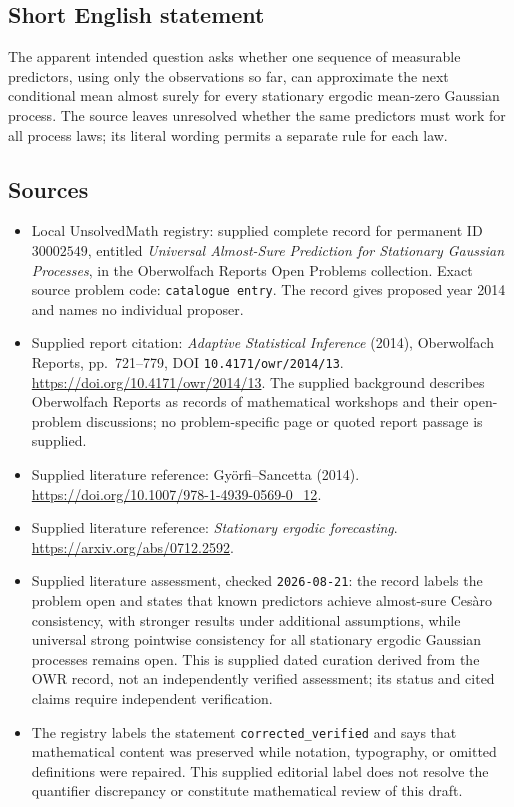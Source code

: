 \documentclass[11pt]{article}
\begin{document}
\subsection{Short English statement}
The apparent intended question asks whether one sequence of measurable predictors, using only the observations so far, can approximate the next conditional mean almost surely for every stationary ergodic mean-zero Gaussian process. The source leaves unresolved whether the same predictors must work for all process laws; its literal wording permits a separate rule for each law.
\subsection{Sources}
\begin{itemize}
\item Local UnsolvedMath registry: supplied complete record for permanent ID \(30002549\), entitled \emph{Universal Almost-Sure Prediction for Stationary Gaussian Processes}, in the Oberwolfach Reports Open Problems collection. Exact source problem code: \texttt{catalogue entry}. The record gives proposed year 2014 and names no individual proposer.
\item Supplied report citation: \emph{Adaptive Statistical Inference} (2014), Oberwolfach Reports, pp.\ 721--779, DOI \texttt{10.4171/owr/2014/13}. \url{https://doi.org/10.4171/owr/2014/13}. The supplied background describes Oberwolfach Reports as records of mathematical workshops and their open-problem discussions; no problem-specific page or quoted report passage is supplied.
\item Supplied literature reference: Györfi--Sancetta (2014). \url{https://doi.org/10.1007/978-1-4939-0569-0_12}.
\item Supplied literature reference: \emph{Stationary ergodic forecasting}. \url{https://arxiv.org/abs/0712.2592}.
\item Supplied literature assessment, checked \texttt{2026-08-21}: the record labels the problem open and states that known predictors achieve almost-sure Cesàro consistency, with stronger results under additional assumptions, while universal strong pointwise consistency for all stationary ergodic Gaussian processes remains open. This is supplied dated curation derived from the OWR record, not an independently verified assessment; its status and cited claims require independent verification.
\item The registry labels the statement \texttt{corrected\_verified} and says that mathematical content was preserved while notation, typography, or omitted definitions were repaired. This supplied editorial label does not resolve the quantifier discrepancy or constitute mathematical review of this draft.
\end{itemize}
\end{document}
